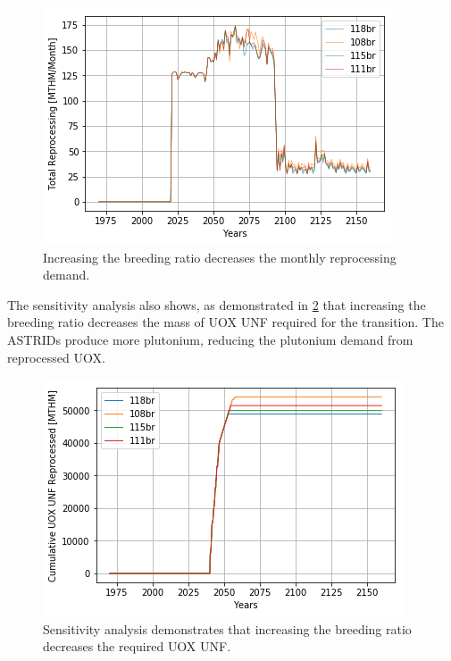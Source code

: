 \begin{figure}[htbp!]
    \begin{center}
        \includegraphics[scale=0.6]{./images/sensitivity/br_tot_rep.png}
    \end{center}
    \caption{Increasing the breeding ratio decreases the monthly reprocessing 
    demand.}
    \label{fig:br_rep}
\end{figure}


The sensitivity analysis also shows, as demonstrated in \cref{fig:br_uox} that 
increasing the breeding ratio decreases the mass of \gls{UOX} \gls{UNF} 
required for the transition. The \glspl{ASTRID} produce more plutonium, reducing the plutonium demand from reprocessed \gls{UOX}.


\begin{figure}[htbp!]
    \begin{center}
        \includegraphics[scale=0.6]{./images/sensitivity/br_uox_unf_cum.png}
    \end{center}
    \caption{Sensitivity analysis demonstrates that increasing the breeding 
    ratio decreases the required \gls{UOX} \gls{UNF}. }
    \label{fig:br_uox}
\end{figure}



